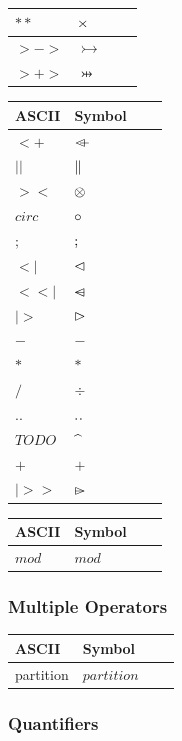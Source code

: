 \begin{center}
\begin{tabular}{ | l | l | l | p{5cm} |}
	$**$ & $\mathbin\times$ \\ \hline
	$>->$ & $\tinj$ \\ \hline
	$>+>$ & $\pinj$ \\ \hline
    \end{tabular}
    \begin{tabular}{ | l | l | l | p{5cm} |}
    \hline
	ASCII & Symbol \\ \hline
	$<+$ & $\mathbin{\lhd\mkern-9mu-}$ \\ \hline
	$||$ & $\mathbin\|$ \\ \hline
	$><$ & $\mathbin\otimes$ \\ \hline
	$circ$ & $\circ$ \\ \hline
	$;$ & $\mathbin;$ \\ \hline
	$<|$ & $\mathbin\lhd$ \\ \hline
	$<<|$ & $\mathbin{\lhd\mkern-14mu-}$ \\ \hline
	$|>$ & $\mathbin\rhd$ \\ \hline
	$-$ & $-$ \\ \hline
	$*$ & $*$ \\ \hline
	$/$ & $\div$ \\ \hline
	$..$ & $\mathbin{.\mkern1mu.}$ \\ \hline
	$TODO$ & $\mathbin{\widehat{\enskip}}$ \\ \hline
	$+$ & $+$ \\ \hline
	$|>>$ & $\mathbin{\rhd\mkern-14mu-}$ \\ \hline
    \end{tabular}
    \begin{tabular}{ | l | l | l | p{5cm} |}
    \hline
	ASCII & Symbol \\ \hline
	$mod$ & $mod$ \\ \hline
    \end{tabular}
\end{center}

\subsubsection{Multiple Operators}

\begin{center}
    \begin{tabular}{ | l | l | l | p{5cm} |}
    \hline
	ASCII & Symbol \\ \hline
	partition & $partition$ \\ \hline
    \end{tabular}
\end{center}

\subsubsection{Quantifiers}

